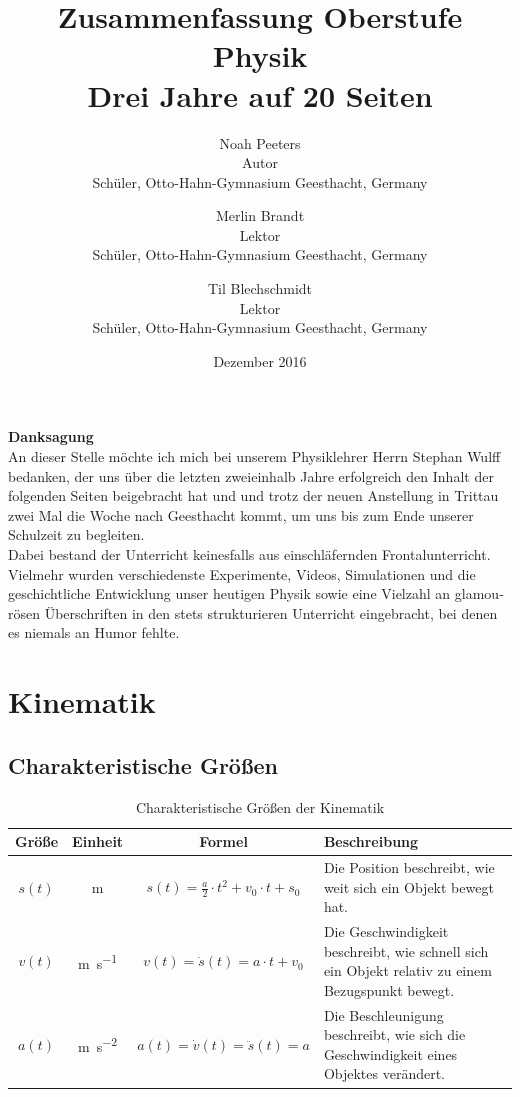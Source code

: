 \documentclass[a4paper]{article}
\title{}
\author{}
\title{Zusammenfassung Oberstufe Physik\\Drei Jahre auf 20 Seiten}
\author{Noah Peeters\\ Autor\\ \small{Schüler, Otto-Hahn-Gymnasium Geesthacht, Germany} \and Merlin Brandt\\ Lektor\\\small{Schüler, Otto-Hahn-Gymnasium Geesthacht, Germany} \and Til Blechschmidt\\Lektor\\ \small{Schüler, Otto-Hahn-Gymnasium Geesthacht, Germany}}
\date{Dezember 2016}
\begin{document}
	
	
	\maketitle
	
	
	\newpage
	

	\begin{center}
		
		{\LARGE \textbf{Danksagung}\\[30pt]}
		An dieser Stelle möchte ich mich bei unserem Physiklehrer Herrn Stephan Wulff bedanken, der uns über die letzten zweieinhalb Jahre erfolgreich den Inhalt der folgenden Seiten beigebracht hat und und trotz der neuen Anstellung in Trittau zwei Mal die Woche nach Geesthacht kommt, um uns bis zum Ende unserer Schulzeit zu begleiten.\\
		Dabei bestand der Unterricht keinesfalls aus einschläfernden Frontalunterricht. Vielmehr wurden verschiedenste Experimente, Videos, Simulationen und die geschichtliche Entwicklung unser heutigen Physik sowie eine Vielzahl an gla­mou­rösen Überschriften in den stets strukturieren Unterricht eingebracht, bei denen es niemals an Humor fehlte.
	\end{center}
	
	\newpage
	
	
	
	\tableofcontents
	\listoffigures
	\listoftables
	\newpage
	
	\section{Kinematik}
		\subsection{Charakteristische Größen}
			\begin{table}[H]
				\def\arraystretch{1.5}
				\begin{tabularx}{\textwidth}{|c|c|c|X|}\hline
					Größe & Einheit & Formel & Beschreibung \\\hline
					$s(t)$ & \si{\meter} & $s(t) = \frac{a}{2}\cdot t^2+v_0\cdot t+s_0$ & Die Position beschreibt, wie weit sich ein Objekt bewegt hat.\\\hline
					$v(t)$ & \si{\meter\per\second}  & $v(t) = \dot{s}(t) = a\cdot t+v_0$ & Die Geschwindigkeit beschreibt, wie schnell sich ein Objekt relativ zu einem Bezugspunkt bewegt.\\\hline
					$a(t)$ & \si{\meter\per\second\squared} & $a(t) = \dot{v}(t) = \ddot{s}(t) = a$ & Die Beschleunigung beschreibt, wie sich die Geschwindigkeit eines Objektes verändert.\\\hline
				\end{tabularx}
				\caption {Charakteristische Größen der Kinematik}
				\label{table:kinematik_grossen}
			\end{table}
		
\end{document}
